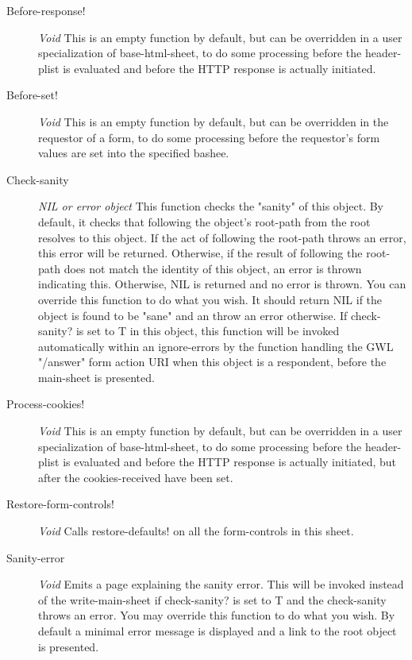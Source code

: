 \documentclass [11pt]{book}
\begin{document}
\begin{itemize}
\begin{description}
\item [Before-response!]
\emph{Void} This is an empty function by default, but can be overridden in
a user specialization of base-html-sheet, to do some processing before the
header-plist is evaluated and before the HTTP response is actually initiated.


\item [Before-set!]
\emph{Void} This is an empty function by default, but can be overridden in
the requestor of a form, to do some processing before the requestor's form
values are set into the specified bashee.


\item [Check-sanity]
\emph{NIL or error object} This function checks the "sanity" of this object. By
default, it checks that following the object's root-path from the root resolves
to this object. If the act of following the root-path throws an error, this error
will be returned. Otherwise, if the result of following the root-path does not
match the identity of this object, an error is thrown indicating this. Otherwise,
NIL is returned and no error is thrown. You can override this function to do what
you wish. It should return NIL if the object is found to be "sane" and an throw
an error otherwise.
If check-sanity? is set to T in this object, this function will be invoked automatically
within an ignore-errors by the function handling the GWL "/answer" form action URI
when this object is a respondent, before the main-sheet is presented.


\item [Process-cookies!]
\emph{Void} This is an empty function by default, but can be overridden in
a user specialization of base-html-sheet, to do some processing before the
header-plist is evaluated and before the HTTP response is actually initiated, but after
the cookies-received have been set.


\item [Restore-form-controls!]
\emph{Void} Calls restore-defaults! on all the form-controls in this sheet.


\item [Sanity-error]
\emph{Void} Emits a page explaining the sanity error. This will be invoked instead of the write-main-sheet
if check-sanity? is set to T and the check-sanity throws an error. You may override this function to
do what you wish. By default a minimal error message is displayed and a link to the root object
is presented.



\end{description}
\end{itemize}
\end{document}
